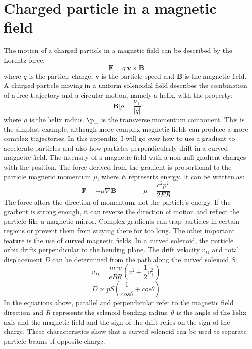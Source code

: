 \chapter{Charged particle in a magnetic field}\label{appendix1}
The motion of a charged particle in a magnetic field can be described by the Lorentz force:
\begin{equation}
    \mathbf{F}=q \ \mathbf{v}\times\mathbf{B}
\end{equation}
where $q$ is the particle charge, $\mathbf{v}$ is the particle speed and $\mathbf{B}$ is 
the magnetic field.
A charged particle moving in a uniform solenoidal field describes the 
combination of a free trajectory and a circular motion, namely a helix, with the property:
\begin{equation}\label{partincamp}
    |\mathbf{B}|\rho=\frac{p_\perp}{|q|}
\end{equation}
where $\rho$ is the helix radius, $\p_\perp$ is the transverse momentum component.
This is the simplest example, although more complex magnetic fields can 
produce a more complex trajectories. In this appendix, I will go over how to 
use a gradient to accelerate particles and also how particles perpendicularly 
drift in a curved magnetic field. The intensity of a magnetic field with a 
non-null gradient changes with the position. The force derived from the gradient is 
proportional to the particle magnetic momentum $\mu$, where $E$ represents 
energy. It can be written as:
\begin{equation}
   \mathbf{F}=-\mu \nabla \mathbf{B} \qquad \qquad \mu=\frac{c^2 p_\perp^2}{2 E B}
\end{equation}
The force alters the direction of momentum, not the particle's energy. If the 
gradient is strong enough, it can reverse the direction of motion and reflect 
the particle like a magnetic mirror. Complex gradients can trap particles in 
certain regions or prevent them from staying there for too long.
The other important feature is the use of curved magnetic fields. In a curved 
solenoid, the particle orbit drifts perpendicular to the bending plane. 
The drift velocity $v_D$ and total displacement $D$ can be determined from 
the path along the curved solenoid $S$:
\begin{equation}
    v_D=\frac{m \gamma c}{e B R}(v_\parallel ^2+\frac{1}{2}v_\perp ^2)
\end{equation}
\begin{equation}
    D \propto p S (\frac{1}{cos \theta} + cos \theta)
\end{equation}
In the equations above, parallel and perpendicular refer to the magnetic field direction 
and $R$ represents the solenoid bending radius. $\theta$ is 
the angle of the helix axis and the magnetic field and the sign of the drift 
relies on the sign of the charge. These characteristics show that a curved 
solenoid can be used to separate particle beams of opposite charge.
